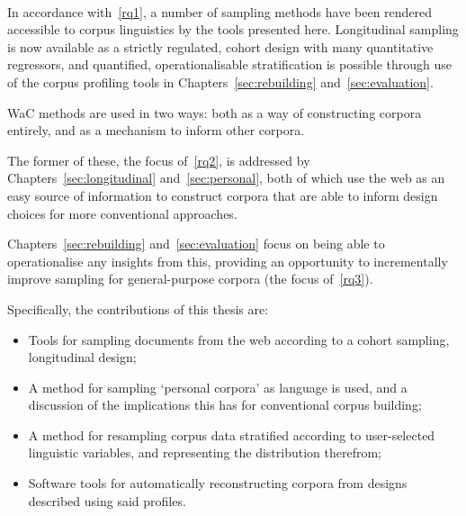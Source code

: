 \paragraph{}
In accordance with~\ref{rq1}, a number of sampling methods have been rendered accessible to corpus linguistics by the tools presented here.  Longitudinal sampling is now available as a strictly regulated, cohort design with many quantitative regressors, and quantified, operationalisable stratification is possible through use of the corpus profiling tools in Chapters~\ref{sec:rebuilding} and~\ref{sec:evaluation}.

WaC methods are used in two ways: both as a way of constructing corpora entirely, and as a mechanism to inform other corpora.

The former of these, the focus of~\ref{rq2}, is addressed by Chapters~\ref{sec:longitudinal} and~\ref{sec:personal}, both of which use the web as an easy source of information to construct corpora that are able to inform design choices for more conventional approaches.

Chapters~\ref{sec:rebuilding} and~\ref{sec:evaluation} focus on being able to operationalise any insights from this, providing an opportunity to incrementally improve sampling for general-purpose corpora (the focus of~\ref{rq3}).

Specifically, the contributions of this thesis are:

\begin{itemize}%
    \item Tools for sampling documents from the web according to a cohort sampling, longitudinal design;
    \item A method for sampling `personal corpora' as language is used, and a discussion of the implications this has for conventional corpus building;
    \item A method for resampling corpus data stratified according to user-selected linguistic variables, and representing the distribution therefrom;
    \item Software tools for automatically reconstructing corpora from designs described using said profiles.
\end{itemize}













